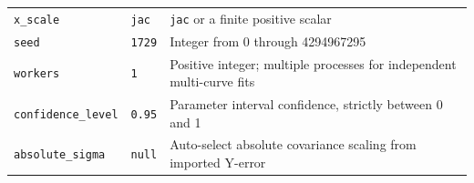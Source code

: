 \documentclass[
  10pt,
  a4paper,
  oneside]{scrreprt}
\begin{document}
\begin{longtable}[]{@{}lll@{}}
\begin{minipage}[t]{0.30\columnwidth}
\texttt{x\_scale}\strut
\end{minipage} & \begin{minipage}[t]{0.30\columnwidth}\raggedright
\texttt{jac}\strut
\end{minipage} & \begin{minipage}[t]{0.30\columnwidth}\raggedright
\texttt{jac} or a finite positive scalar\strut
\end{minipage}\tabularnewline
\begin{minipage}[t]{0.30\columnwidth}\raggedright
\texttt{seed}\strut
\end{minipage} & \begin{minipage}[t]{0.30\columnwidth}\raggedright
\texttt{1729}\strut
\end{minipage} & \begin{minipage}[t]{0.30\columnwidth}\raggedright
Integer from 0 through 4294967295\strut
\end{minipage}\tabularnewline
\begin{minipage}[t]{0.30\columnwidth}\raggedright
\texttt{workers}\strut
\end{minipage} & \begin{minipage}[t]{0.30\columnwidth}\raggedright
\texttt{1}\strut
\end{minipage} & \begin{minipage}[t]{0.30\columnwidth}\raggedright
Positive integer; multiple processes for independent multi-curve
fits\strut
\end{minipage}\tabularnewline
\begin{minipage}[t]{0.30\columnwidth}\raggedright
\texttt{confidence\_level}\strut
\end{minipage} & \begin{minipage}[t]{0.30\columnwidth}\raggedright
\texttt{0.95}\strut
\end{minipage} & \begin{minipage}[t]{0.30\columnwidth}\raggedright
Parameter interval confidence, strictly between 0 and 1\strut
\end{minipage}\tabularnewline
\begin{minipage}[t]{0.30\columnwidth}\raggedright
\texttt{absolute\_sigma}\strut
\end{minipage} & \begin{minipage}[t]{0.30\columnwidth}\raggedright
\texttt{null}\strut
\end{minipage} & \begin{minipage}[t]{0.30\columnwidth}\raggedright
Auto-select absolute covariance scaling from imported Y-error

\end{minipage}
\end{longtable}
\end{document}
